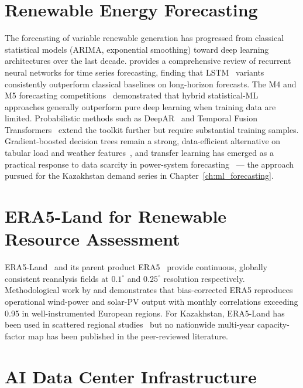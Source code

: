 \section{Renewable Energy Forecasting}
\label{sec:lit_forecasting}

The forecasting of variable renewable generation has progressed from classical statistical models (ARIMA, exponential smoothing) toward deep learning architectures over the last decade. \cite{hewamalage2021} provides a comprehensive review of recurrent neural networks for time series forecasting, finding that LSTM~\cite{hochreiter1997} variants consistently outperform classical baselines on long-horizon forecasts. The M4 and M5 forecasting competitions~\cite{makridakis2018} demonstrated that hybrid statistical-ML approaches generally outperform pure deep learning when training data are limited. Probabilistic methods such as DeepAR~\cite{salinas2020} and Temporal Fusion Transformers~\cite{lim2021} extend the toolkit further but require substantial training samples. Gradient-boosted decision trees remain a strong, data-efficient alternative on tabular load and weather features~\cite{wang2019cnnlstm}, and transfer learning has emerged as a practical response to data scarcity in power-system forecasting~\cite{pan2010transfer, cai2020transfer} --- the approach pursued for the Kazakhstan demand series in Chapter~\ref{ch:ml_forecasting}.

\section{ERA5-Land for Renewable Resource Assessment}
\label{sec:lit_era5}

ERA5-Land~\cite{munoz2021} and its parent product ERA5~\cite{hersbach2020} provide continuous, globally consistent reanalysis fields at $0.1^{\circ}$ and $0.25^{\circ}$ resolution respectively. Methodological work by \cite{staffell2016} and \cite{pfenninger2016} demonstrates that bias-corrected ERA5 reproduces operational wind-power and solar-PV output with monthly correlations exceeding 0.95 in well-instrumented European regions. For Kazakhstan, ERA5-Land has been used in scattered regional studies~\cite{koshim2018} but no nationwide multi-year capacity-factor map has been published in the peer-reviewed literature.

\section{AI Data Center Infrastructure}
\label{sec:lit_aidc}


